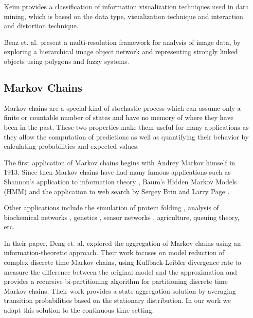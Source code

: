Keim \cite{981847} provides a classification of information visualization techniques used in data mining, which is based on
the data type, visualization technique and interaction and distortion technique.

Benz et. al. \cite{Benz2004239} present a multi-resolution framework for analysis of image data, by exploring a hierarchical
image object network and representing strongly linked objects using polygons and fuzzy systems.

\subsection{Markov Chains}

Markov chains are a special kind of stochastic process
which can assume only a finite or countable number of states and have no memory of where they have been in the past.
These two properties make them useful for many applications as they allow the computation of predictions as
well as quantifying their behavior by calculating probabilities and expected values.

The first application of Markov chains begins with Andrey Markov himself \cite{markov13} in 1913. Since then
Markov chains have had many famous applications such as Shannon's application to information theory \cite{Shannon:1948},
Baum's Hidden Markov Models (HMM) \cite{baum1970} and the application to web search by Sergey Brin and Larry Page \cite{Lawrence981}.

Other applications include the simulation of protein folding \cite{pande-beauchamp-bowman:2010:methods:markov-model-review},
analysis of biochemical networks \cite{Ciocchetta2009145},
genetics \cite{Huelsenbeck2310}, sensor networks \cite{DBLP:journals/corr/AlsheikhHNTL15}, agriculture, queuing theory, etc.

In their paper, Deng et. al. \cite{5746509} explored the aggregation of Markov chains using an information-theoretic
approach. Their work focuses on model reduction of complex discrete time Markov chains, using Kullback-Leibler divergence
rate to measure the difference between the original model and the approximation and provides a recursive bi-partitioning
algorithm for partitioning discrete time Markov chains. Their work provides a state aggregation solution by averaging
transition probabilities based on the stationary distribution. In our work we adapt this solution to the continuous time
setting.


